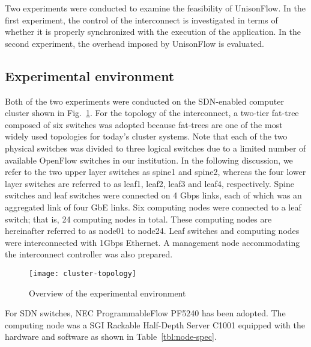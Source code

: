 Two experiments were conducted to examine the feasibility of UnisonFlow.
In the first experiment, the control of the interconnect is investigated
in terms of whether it is properly synchronized with the execution of
the application. In the second experiment, the overhead imposed by
UnisonFlow is evaluated.

\subsection{Experimental environment}

Both of the two experiments were conducted on the SDN-enabled computer
cluster shown in Fig.~\ref{fig:cluster-topology}. For the topology of
the interconnect, a two-tier fat-tree composed of six switches was
adopted because fat-trees are one of the most widely used topologies for
today's cluster systems. Note that each of the two physical switches was
divided to three logical switches due to a limited number of available
OpenFlow switches in our institution. In the following discussion, we
refer to the two upper layer switches as spine1 and spine2, whereas the
four lower layer switches are referred to as leaf1, leaf2, leaf3 and
leaf4, respectively. Spine switches and leaf switches were connected on
4 Gbps links, each of which was an aggregated link of four GbE links.
Six computing nodes were connected to a leaf switch; that is, 24
computing nodes in total. These computing nodes are hereinafter referred
to as node01 to node24. Leaf switches and computing nodes were
interconnected with 1Gbps Ethernet. A management node accommodating the
interconnect controller was also prepared.

\begin{figure}
    \centering
    \texttt{[image: cluster-topology]}
    \caption{Overview of the experimental environment}%
    \label{fig:cluster-topology}
\end{figure}

For SDN switches, NEC ProgrammableFlow PF5240 has been adopted. The computing
node was a SGI Rackable Half-Depth Server C1001 equipped with the hardware and
software as shown in Table~\ref{tbl:node-spec}.

